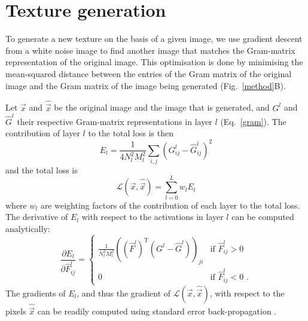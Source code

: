 \documentclass{article} %
\begin{document}
\section{Texture generation}
To generate a new texture on the basis of a given image, we use gradient descent from a white noise image to find another image that matches the Gram-matrix representation of the original image. This optimisation is done by minimising the mean-squared distance between the entries of the Gram matrix of the original image and the Gram matrix of the image being generated (Fig.~\ref{method}B). 

Let $\vec{x}$ and $\hat{\vec{x}}$ be the original image and the image that is generated, and $G^l$ and $\hat{G}^l$ their respective Gram-matrix representations in layer $l$ (Eq.~\ref{gram}). The contribution of layer $l$ to the total loss is then
\begin{equation}
E_l = \frac{1}{4 N_l^2 M_l^2}\sum_{i,j}\left(G^l_{ij}-\hat{G}^l_{ij}\right)^2
\end{equation}
and the total loss is 
\begin{equation}
\mathcal{L}(\vec{x},\hat{\vec{x}}) = \sum_{l=0}^{L}w_{l}E_l
\end{equation}
where $w_l$ are weighting factors of the contribution of each layer to the total loss.
The derivative of $E_l$ with respect to the activations in layer $l$ can be computed analytically:
\begin{equation}
\frac{\partial E_l}{\partial \hat{F}_{ij}^l} =
  \begin{cases}
   \frac{1}{N_l^2 M_l^2}\left((\hat{F}^l)^{\mathrm T}\left(G^l-\hat{G}^l\right)\right)_{ji} & \text{if } \hat{F}_{ij}^l > 0 \\
   0       & \text{if } \hat{F}_{ij}^l < 0 \text{ .}
  \end{cases}
\end{equation}
The gradients of $E_l$, and thus the gradient of $\mathcal{L}(\vec{x},\hat{\vec{x}})$, with respect to the pixels $\hat{\vec{x}}$ can be readily computed using standard error back-propagation \cite{lecun_efficient_2012}. 
\end{document}
